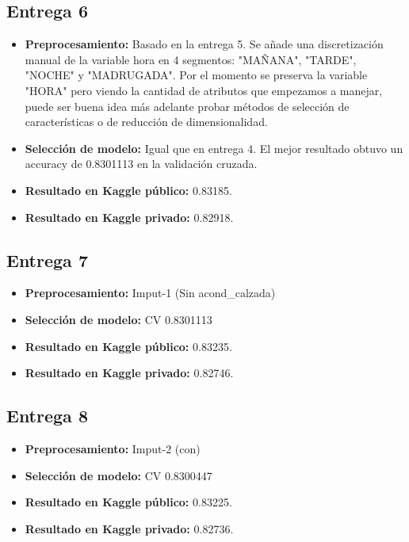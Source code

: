 \subsection{Entrega 6} %
\begin{itemize}
\item \textbf{Preprocesamiento:} Basado en la entrega 5. Se añade una discretización manual de la variable hora en 4 segmentos: "MAÑANA", "TARDE", "NOCHE" y "MADRUGADA". Por el momento se preserva la variable "HORA" pero viendo la cantidad de atributos que empezamos a manejar, puede ser buena idea más adelante probar métodos de selección de características o de reducción de dimensionalidad.
\item \textbf{Selección de modelo:} Igual que en entrega 4. El mejor resultado obtuvo un accuracy de 0.8301113 en la validación cruzada.
\item \textbf{Resultado en Kaggle público:} 0.83185.
\item \textbf{Resultado en Kaggle privado:} 0.82918.
\end{itemize}

\subsection{Entrega 7}
\begin{itemize}
\item \textbf{Preprocesamiento:} Imput-1 (Sin acond_calzada)
\item \textbf{Selección de modelo:} CV 0.8301113
\item \textbf{Resultado en Kaggle público:} 0.83235.
\item \textbf{Resultado en Kaggle privado:} 0.82746.
\end{itemize}

\subsection{Entrega 8}
\begin{itemize}
\item \textbf{Preprocesamiento:} Imput-2 (con)
\item \textbf{Selección de modelo:} CV 0.8300447
\item \textbf{Resultado en Kaggle público:} 0.83225.
\item \textbf{Resultado en Kaggle privado:} 0.82736.
\end{itemize}


